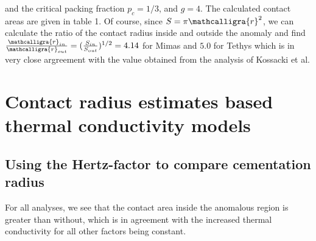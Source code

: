 \documentclass[11pt]{article} %
\newcommand{\sr}{\ensuremath{\mathcalligra{r}} \xspace}
\begin{document}
\begin{itemize}
	and the critical packing fraction $p_{c} = 1/3$, and $g = 4$. The calculated contact areas are given in table 1. Of course, since $S = \pi \sr^{2}$, we can calculate the ratio of the contact radius inside and outside the anomaly and find $\frac{\sr_{in}}{\sr_{out}} = ( \frac{S_{in}}{S_{out}} )^{1/2} = 4.14$ for Mimas and $5.0$ for Tethys which is in very close argreement with the value obtained from the analysis of Kossacki et al.

	
\section{Contact radius estimates based thermal conductivity models}

\subsection{Using the Hertz-factor to compare cementation radius}


	For all analyses, we see that the contact area inside the anomalous region is greater than without, which is in agreement with the increased thermal conductivity for all other factors being constant.	


\end{itemize}
\end{document}
